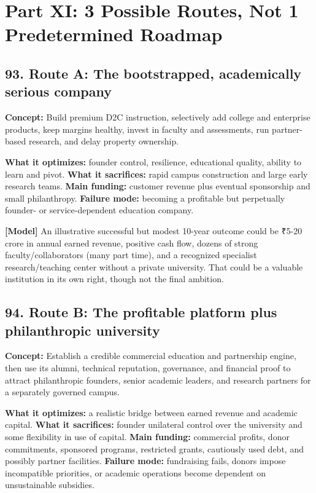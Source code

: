 
\section*{Part XI: 3 Possible Routes, Not 1 Predetermined Roadmap}

\subsection{93. Route A: The bootstrapped, academically serious company}

\textbf{Concept:} Build premium D2C instruction, selectively add college and enterprise products, keep margins healthy, invest in faculty and assessments, run partner-based research, and delay property ownership.

\textbf{What it optimizes:} founder control, resilience, educational quality, ability to learn and pivot.
\textbf{What it sacrifices:} rapid campus construction and large early research teams.
\textbf{Main funding:} customer revenue plus eventual sponsorship and small philanthropy.
\textbf{Failure mode:} becoming a profitable but perpetually founder- or service-dependent education company.

\textbf{\textbf{[Model]}} An illustrative successful but modest 10-year outcome could be \textnormal{₹}5-20 crore in annual earned revenue, positive cash flow, dozens of strong faculty/\allowbreak collaborators (many part time), and a recognized specialist research/\allowbreak teaching center without a private university. That could be a valuable institution in its own right, though not the final ambition.

\subsection{94. Route B: The profitable platform plus philanthropic university}

\textbf{Concept:} Establish a credible commercial education and partnership engine, then use its alumni, technical reputation, governance, and financial proof to attract philanthropic founders, senior academic leaders, and research partners for a separately governed campus.

\textbf{What it optimizes:} a realistic bridge between earned revenue and academic capital.
\textbf{What it sacrifices:} founder unilateral control over the university and some flexibility in use of capital.
\textbf{Main funding:} commercial profits, donor commitments, sponsored programs, restricted grants, cautiously used debt, and possibly partner facilities.
\textbf{Failure mode:} fundraising fails, donors impose incompatible priorities, or academic operations become dependent on unsustainable subsidies.

